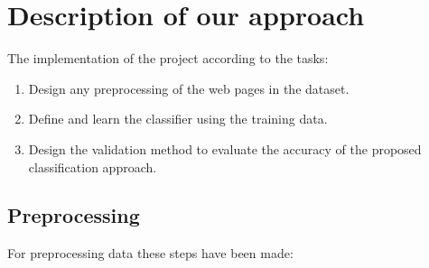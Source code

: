 \documentclass{article} %
\begin{document}
\section{Description of our approach}
  
 The implementation of the project according to the tasks:

\begin{enumerate} 

 \item Design any preprocessing of the web pages in the dataset.

 \item Define and learn the classifier using the training data.

 \item  Design the validation method to evaluate the accuracy of the proposed classification approach.
 
\end{enumerate} 


\subsection{Preprocessing}

 For preprocessing data these steps have been made:
 
\end{document}
